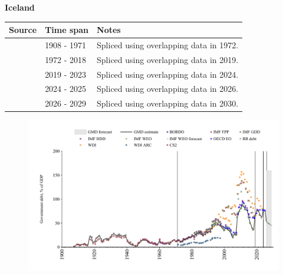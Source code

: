 \documentclass[12pt,a4paper,landscape]{article}
\begin{document}
\begin{adjustbox}{max totalsize={\paperwidth}{\paperheight},center}
\begin{minipage}[t][\textheight][t]{\textwidth}
\vspace*{0.5cm}
{}
\begin{center}
{\Large\bfseries Iceland}
\end{center}
\vspace{0.5cm}
\begin{table}[H]
\centering
\small
\begin{tabular}{|l|l|l|}
\hline
\textbf{Source} & \textbf{Time span} & \textbf{Notes} \\
\hline
\rowcolor{white}\cite{IMF_FPP}& 1908 - 1971 &Spliced using overlapping data in 1972.\\
\rowcolor{lightgray}\cite{IMF_GDD}& 1972 - 2018 &Spliced using overlapping data in 2019.\\
\rowcolor{white}\cite{IMF_FPP}& 2019 - 2023 &Spliced using overlapping data in 2024.\\
\rowcolor{lightgray}\cite{OECD_EO}& 2024 - 2025 &Spliced using overlapping data in 2026.\\
\rowcolor{white}\cite{IMF_WEO_forecast}& 2026 - 2029 &Spliced using overlapping data in 2030.\\
\hline
\end{tabular}
\end{table}
\begin{figure}[H]
\centering
\includegraphics[width=\textwidth,height=0.6\textheight,keepaspectratio]{graphs/ISL_govdebt_GDP.pdf}
\end{figure}
\end{minipage}
\end{adjustbox}
\end{document}
